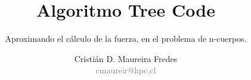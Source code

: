 \documentclass{beamer}
\author{\large Cristián D. Maureira Fredes\\\normalsize \textcolor{gray}{cmaureir@hpc.cl}}
\title{\Huge Algoritmo Tree Code}
\subtitle{Aproximando el cálculo de la fuerza, en el problema de n-cuerpos.}
\institute{Universidad Técnica\\ Federico Santa María}
\begin{document}
\begin{frame}[t,plain]
\titlepage
\end{frame}



\begin{frame}[t,plain]
\titlepage
\end{frame}
\end{document}
